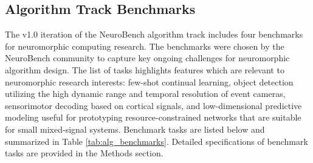 \subsection*{Algorithm Track Benchmarks}

    The v1.0 iteration of the NeuroBench algorithm track includes four benchmarks for neuromorphic computing research. The benchmarks were chosen by the NeuroBench community to capture key ongoing challenges for neuromorphic algorithm design. The list of tasks highlights features which are relevant to neuromorphic research interests: few-shot continual learning, object detection utilizing the high dynamic range and temporal resolution of event cameras, sensorimotor decoding based on cortical signals, and low-dimensional predictive modeling useful for prototyping resource-constrained networks that are suitable for small mixed-signal systems.
    Benchmark tasks are listed below and summarized in Table \ref{tab:alg_benchmarks}. Detailed specifications of benchmark tasks are provided in the Methods section. 
    
    
    

